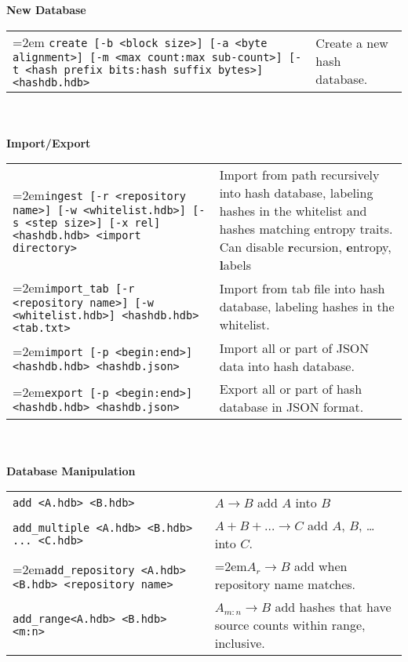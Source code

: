 \begin{footnotesize}
\textbf{New Database} \\
\begin{tabular}{p{3.6 in} p{3.0 in}}
\hangindent=2em \texttt{create [-b <block size>] [-a <byte alignment>] [-m <max count:max sub-count>] [-t <hash prefix bits:hash suffix bytes>] <hashdb.hdb>} &
Create a new hash database.\\
\end{tabular}
\\
\\
\textbf{Import/Export} \\
\begin{tabular}{p{3.6 in} p{3.0 in}}
\hangindent=2em\texttt{ingest [-r <repository name>] [-w <whitelist.hdb>] [-s <step size>] [-x rel] <hashdb.hdb> <import directory>} &
Import from path recursively into hash database, labeling hashes in the whitelist and hashes matching entropy traits.  Can disable \textbf{r}ecursion, \textbf{e}ntropy, \textbf{l}abels \\
\hangindent=2em\texttt{import\_tab [-r <repository name>] [-w <whitelist.hdb>] <hashdb.hdb> <tab.txt>} &
Import from tab file into hash database, labeling hashes in the whitelist.\\
\hangindent=2em\texttt{import [-p <begin:end>] <hashdb.hdb> <hashdb.json>} &
Import all or part of JSON data into hash database.\\
\hangindent=2em\texttt{export [-p <begin:end>] <hashdb.hdb> <hashdb.json>} &
Export all or part of hash database in JSON format.\\
\end{tabular}
\\
\\
\textbf{Database Manipulation} \\
\begin{tabular}{p{3.6 in} p{3.0 in}}
\texttt{add <A.hdb> <B.hdb>} & $A \rightarrow B$ add $A$ into $B$ \\
\texttt{add\_multiple <A.hdb> <B.hdb> ... <C.hdb>} & $A + B + \ldots \rightarrow C$ add $A$, $B$, \ldots into $C$.\\
\hangindent=2em\texttt{add\_repository <A.hdb> <B.hdb> <repository name>} & \hangindent=2em$A_r \rightarrow B$ add when repository name matches.\\
\texttt{add\_range<A.hdb> <B.hdb> <m:n>} & $A_{m:n} \rightarrow B$ add hashes that have source counts within range, inclusive.\\

\end{tabular}
\end{footnotesize}
